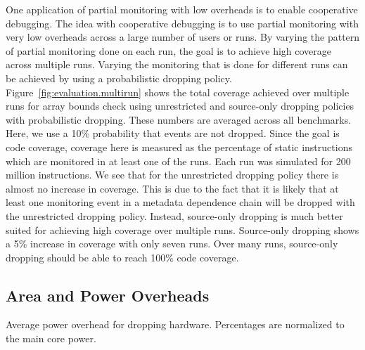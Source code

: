 One application of partial monitoring with low overheads is to enable
cooperative debugging. 
The idea with cooperative debugging is to use partial
monitoring with very low overheads across a large number of users or runs. By
varying the pattern of partial monitoring done on each run, the goal is to
achieve high coverage across multiple runs. Varying the monitoring that is
done for different runs can be achieved by using a probabilistic dropping policy.
Figure~\ref{fig:evaluation.multirun} shows the total
coverage achieved over multiple runs for array bounds check using
unrestricted and source-only dropping policies with probabilistic dropping.
These numbers are averaged across all benchmarks. Here, we use a 10\%
probability
that events are not dropped. Since the goal is code coverage, coverage here is
measured as the percentage of static instructions which are monitored in at
least one of the runs. Each run
was simulated for 200 million instructions. 
We see that for the unrestricted dropping policy there is almost no increase in
coverage.  This is due to the fact that it is likely that at least one
monitoring event in a metadata dependence chain will be dropped with the unrestricted dropping
policy. 
Instead, source-only
dropping is much better suited for achieving high coverage over multiple runs.
Source-only dropping shows a 5\% increase in coverage with only seven runs.
Over many runs, source-only dropping should be able to
reach 100\% code coverage.

\subsection{Area and Power Overheads}

\begin{table}[tb]
  \begin{center}
    \vspace{-0.0in}
    \begin{footnotesize}
    
    \end{footnotesize}
    \caption{Average power overhead for dropping hardware. Percentages 
    are normalized to the main core power.}
    \vspace{-0.2in}
    \label{tab:evaluation.area_power}
  \end{center}
\end{table}

